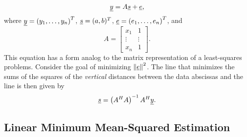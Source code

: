 \begin{equation*}
\underline{y} = A \underline{s} + \underline{e},
\end{equation*}
where $\underline{y} = \left( y_1, \ldots, y_n \right)^T$, $\underline{s} = (a, b)^T$, $\underline{e} = \left( e_1, \ldots, e_n \right)^T$, and
\begin{equation*}
A = \left[ \begin{array}{cc} x_1 & 1 \\
\vdots & \vdots \\ x_n & 1 \end{array} \right] .
\end{equation*}
This equation has a form analog to the matrix representation of a least-squares problems.
Consider the goal of minimizing $\left\| \underline{e} \right\|^2$.
The line that minimizes the sums of the squares of the \emph{vertical} distances between the data abscissas and the line is then given by
\begin{equation*}
\underline{s} = \left( A^H A \right)^{-1} A^H \underline{y} .
\end{equation*}


\subsection{Linear Minimum Mean-Squared Estimation}

